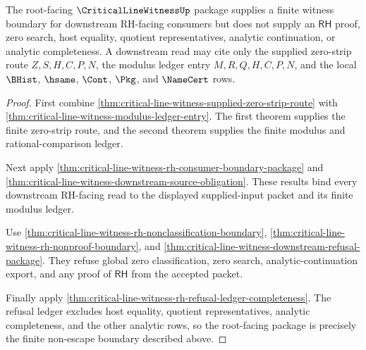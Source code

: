 \begin{theorem}
\label{thm:critical-line-witness-rh-nonescape-package}
The root-facing $\CriticalLineWitnessUp$ package supplies a finite witness boundary for downstream RH-facing consumers but does not supply an $\mathsf{RH}$ proof, zero search, host equality, quotient representatives, analytic continuation, or analytic completeness. A downstream read may cite only the supplied zero-strip route $Z,S,H,C,P,N$, the modulus ledger entry $M,R,Q,H,C,P,N$, and the local $\BHist$, $\hsame$, $\Cont$, $\Pkg$, and $\NameCert$ rows.
\end{theorem}
\begin{proof}
First combine \autoref{thm:critical-line-witness-supplied-zero-strip-route} with \autoref{thm:critical-line-witness-modulus-ledger-entry}. The first theorem supplies the finite zero-strip route, and the second theorem supplies the finite modulus and rational-comparison ledger.

Next apply \autoref{thm:critical-line-witness-rh-consumer-boundary-package} and \autoref{thm:critical-line-witness-downstream-source-obligation}. These results bind every downstream RH-facing read to the displayed supplied-input packet and its finite modulus ledger.

Use \autoref{thm:critical-line-witness-rh-nonclassification-boundary}, \autoref{thm:critical-line-witness-rh-nonproof-boundary}, and \autoref{thm:critical-line-witness-downstream-refusal-package}. They refuse global zero classification, zero search, analytic-continuation export, and any proof of $\mathsf{RH}$ from the accepted packet.

Finally apply \autoref{thm:critical-line-witness-rh-refusal-ledger-completeness}. The refusal ledger excludes host equality, quotient representatives, analytic completeness, and the other analytic rows, so the root-facing package is precisely the finite non-escape boundary described above.
\end{proof}


